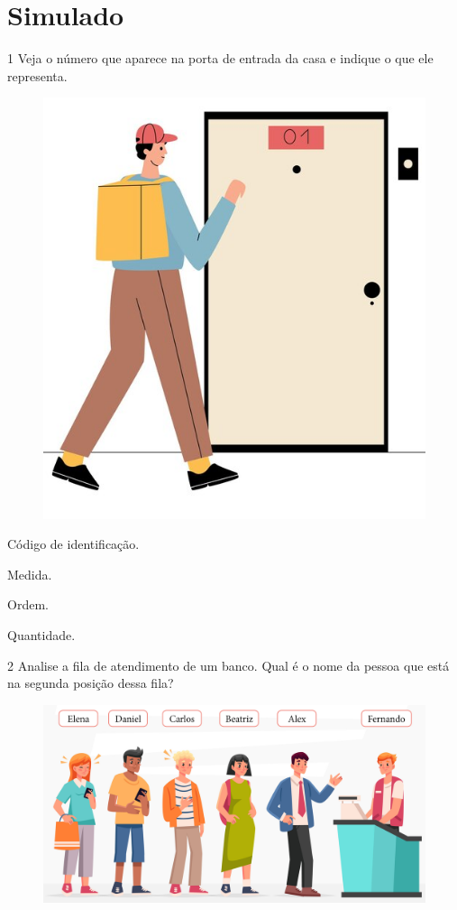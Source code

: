 \setcounter{chapter}{0}
\chapter[Simulado 1]{Simulado}

\num{1} Veja o número que aparece na porta de entrada da casa e indique o que
ele representa.

\begin{figure}[H]
\centering
\includegraphics[width=.6\textwidth]{./media/image105old.png}
\end{figure}


\begin{escolha}[itemsep=-5pt]
\begin{multicols}{2}
\item Código de identificação.

\item Medida.

\item Ordem.

\item Quantidade.
\end{multicols}
\end{escolha}

\num{2} Analise a fila de atendimento de um banco. Qual é o nome da pessoa que
está na segunda posição dessa fila?

\begin{figure}[H]
\centering
\includegraphics[width=.8\textwidth]{./media/image113.png}
\end{figure}

